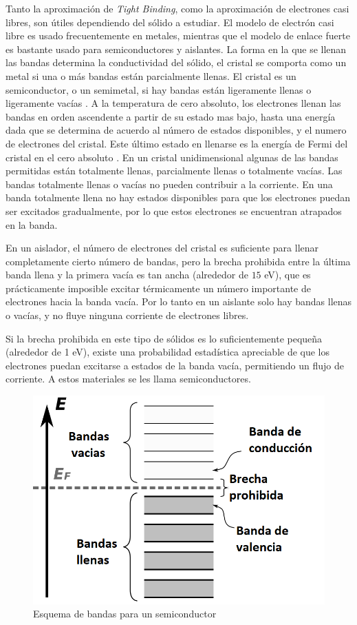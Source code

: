 Tanto la aproximación de \textit{Tight Binding}, como la aproximación de electrones casi libres, son útiles dependiendo del sólido a estudiar. El modelo de electrón casi libre es usado frecuentemente en metales, mientras que el modelo de enlace fuerte es bastante usado para semiconductores y aislantes. 
La forma en la que se llenan las bandas determina la conductividad del sólido, el cristal se comporta como un metal si una o más bandas están parcialmente llenas. El cristal es un semiconductor, o un semimetal, si hay bandas están ligeramente llenas o ligeramente vacías \cite{kittel}. A la temperatura de cero absoluto, los electrones llenan las bandas en orden ascendente a partir de su estado mas bajo, hasta una energía dada que se determina de acuerdo al número de estados disponibles, y el numero de electrones del cristal. Este último estado en llenarse es la energía de Fermi del cristal en el cero absoluto \cite{solidos}. En un cristal unidimensional algunas de las bandas permitidas están totalmente llenas, parcialmente llenas o totalmente vacías. Las bandas totalmente llenas o vacías no pueden contribuir a la corriente. En una banda totalmente llena no hay estados disponibles para que los electrones puedan ser excitados gradualmente, por lo que estos electrones se encuentran atrapados en la banda.

En un aislador, el número de electrones del cristal es suficiente para llenar completamente cierto número de bandas, pero la brecha prohibida entre la última banda llena y la primera vacía es tan ancha (alrededor de $15$ eV), que es prácticamente imposible excitar térmicamente un número importante de electrones hacia la banda vacía. Por lo tanto en un aislante solo hay bandas llenas o vacías, y no fluye ninguna corriente de electrones libres.

Si la brecha prohibida en este tipo de sólidos es lo suficientemente pequeña (alrededor de 1 eV), existe una probabilidad estadística apreciable de que los electrones puedan excitarse a estados de la banda vacía, permitiendo un flujo de corriente. A estos materiales se les llama semiconductores. 

\begin{figure}[H]
    \centering
    \includegraphics[scale=.5]{imagenes/Semiconductor_band_structure.png}
    \caption{Esquema de bandas para un semiconductor}
    \label{fig:1.2}
\end{figure}

